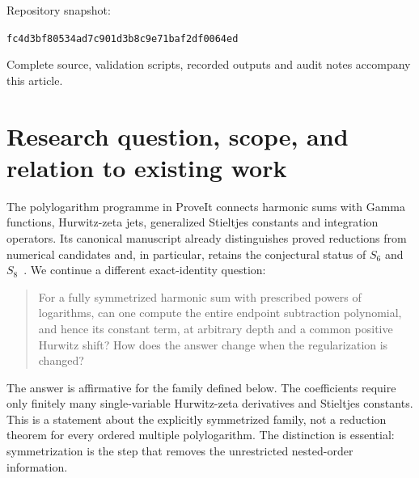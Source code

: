\documentclass[11pt,oneside]{article}
\numberwithin{equation}{section}
\theoremstyle{definition}
\theoremstyle{remark}
\newcommand{\src}[1]{\nolinkurl{#1}}
\begin{document}
\begin{titlepage}
\begin{abstract}
The symmetric-sum principle, Gamma regularization, and the height-one Gamma
identity are classical ingredients, not claimed discoveries. The contribution
is the unified, normalization-explicit shifted and decorated calculus, its
consequences, and its reproducible implementation. All stated universal
identities have proofs; finite symbolic tests and numerical diagnostics are
kept distinct from those proofs. No arithmetic independence, resolution of
the repository's $S_6$ or $S_8$ conjectures, or proof-assistant formalization
is claimed.
\end{abstract}
\vfill
\noindent\small Repository snapshot:\par
\noindent\src{fc4d3bf80534ad7c901d3b8c9e71baf2df0064ed}\par
\noindent Complete source, validation scripts, recorded outputs and audit notes
accompany this article.
\end{titlepage}

\begingroup
\small
\setlength{\parskip}{0pt}
\tableofcontents
\endgroup
\newpage

\section{Research question, scope, and relation to existing work}

The polylogarithm programme in ProveIt connects harmonic sums with Gamma
functions, Hurwitz-zeta jets, generalized Stieltjes constants and integration
operators. Its canonical manuscript already distinguishes proved reductions
from numerical candidates and, in particular, retains the conjectural status
of $S_6$ and $S_8$~\cite{repo}. We continue a different exact-identity question:

\begin{quote}
For a fully symmetrized harmonic sum with prescribed powers of logarithms,
can one compute the entire endpoint subtraction polynomial, and hence its
constant term, at arbitrary depth and a common positive Hurwitz shift?
How does the answer change when the regularization is changed?
\end{quote}

The answer is affirmative for the family defined below. The coefficients
require only finitely many single-variable Hurwitz-zeta derivatives and
Stieltjes constants. This is a statement about the explicitly symmetrized
family, not a reduction theorem for every ordered multiple polylogarithm.
The distinction is essential: symmetrization is the step that removes the
unrestricted nested-order information.
\end{document}
